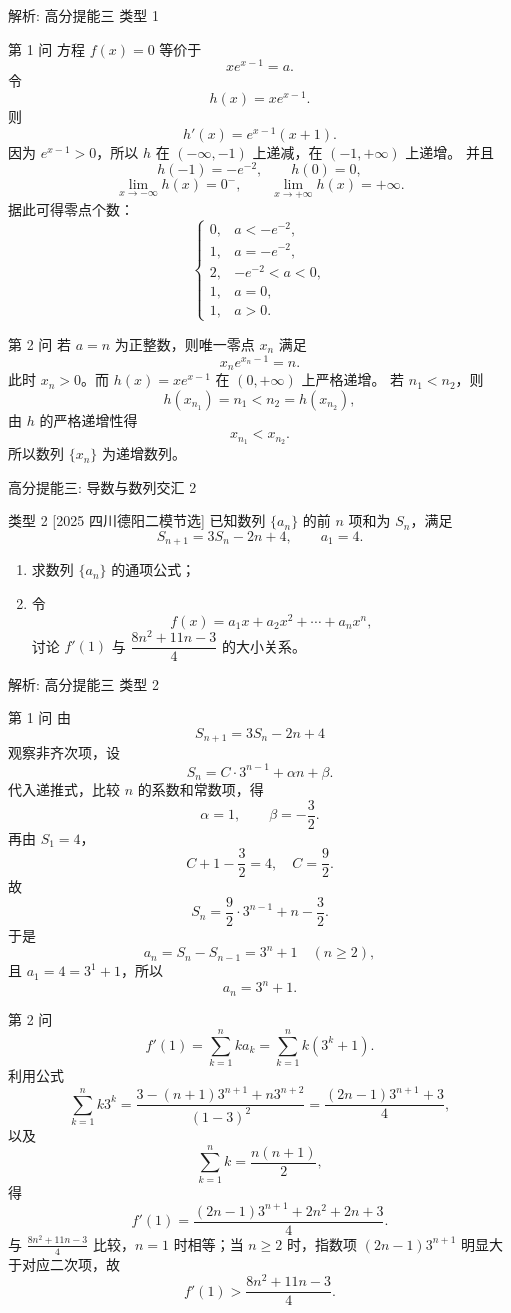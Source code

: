 ﻿\documentclass[aspectratio=169,10pt]{ctexbeamer}
\begin{document}
\begin{frame}[t,allowframebreaks]{解析: 高分提能三 类型 1}
\tiny
\begin{block}{第 1 问}
方程 $f(x)=0$ 等价于
\[
xe^{x-1}=a.
\]
令
\[
h(x)=xe^{x-1}.
\]
则
\[
h'(x)=e^{x-1}(x+1).
\]
因为 $e^{x-1}>0$，所以 $h$ 在 $(-\infty,-1)$ 上递减，在 $(-1,+\infty)$ 上递增。
并且
\[
h(-1)=-e^{-2},\qquad h(0)=0,
\]
\[
\lim_{x\to-\infty}h(x)=0^-,\qquad \lim_{x\to+\infty}h(x)=+\infty.
\]
据此可得零点个数：
\[
\begin{cases}
0,&a<-e^{-2},\\
1,&a=-e^{-2},\\
2,&-e^{-2}<a<0,\\
1,&a=0,\\
1,&a>0.
\end{cases}
\]
\end{block}
\begin{block}{第 2 问}
若 $a=n$ 为正整数，则唯一零点 $x_n$ 满足
\[
x_ne^{x_n-1}=n.
\]
此时 $x_n>0$。而 $h(x)=xe^{x-1}$ 在 $(0,+\infty)$ 上严格递增。
若 $n_1<n_2$，则
\[
h(x_{n_1})=n_1<n_2=h(x_{n_2}),
\]
由 $h$ 的严格递增性得
\[
x_{n_1}<x_{n_2}.
\]
所以数列 $\{x_n\}$ 为递增数列。
\end{block}
\end{frame}

\begin{frame}[t]{高分提能三: 导数与数列交汇 2}
\large
\begin{block}{类型 2}
[2025 四川德阳二模节选] 已知数列 $\{a_n\}$ 的前 $n$ 项和为 $S_n$，满足
\[
S_{n+1}=3S_n-2n+4,\qquad a_1=4.
\]
\begin{enumerate}
  \item 求数列 $\{a_n\}$ 的通项公式；
  \item 令
  \[
  f(x)=a_1x+a_2x^2+\cdots+a_nx^n,
  \]
  讨论 $f'(1)$ 与 $\dfrac{8n^2+11n-3}{4}$ 的大小关系。
\end{enumerate}
\end{block}
\end{frame}

\begin{frame}[t,allowframebreaks]{解析: 高分提能三 类型 2}
\tiny
\begin{block}{第 1 问}
由
\[
S_{n+1}=3S_n-2n+4
\]
观察非齐次项，设
\[
S_n=C\cdot3^{n-1}+\alpha n+\beta.
\]
代入递推式，比较 $n$ 的系数和常数项，得
\[
\alpha=1,\qquad \beta=-\frac32.
\]
再由 $S_1=4$，
\[
C+1-\frac32=4,\quad C=\frac92.
\]
故
\[
S_n=\frac92\cdot3^{n-1}+n-\frac32.
\]
于是
\[
a_n=S_n-S_{n-1}=3^n+1\quad (n\ge2),
\]
且 $a_1=4=3^1+1$，所以
\[
a_n=3^n+1.
\]
\end{block}
\begin{block}{第 2 问}
\[
f'(1)=\sum_{k=1}^n k a_k
=\sum_{k=1}^n k(3^k+1).
\]
利用公式
\[
\sum_{k=1}^n k3^k=\frac{3-(n+1)3^{n+1}+n3^{n+2}}{(1-3)^2}
=\frac{(2n-1)3^{n+1}+3}{4},
\]
以及
\[
\sum_{k=1}^n k=\frac{n(n+1)}2,
\]
得
\[
f'(1)=\frac{(2n-1)3^{n+1}+2n^2+2n+3}{4}.
\]
与 $\frac{8n^2+11n-3}{4}$ 比较，$n=1$ 时相等；当 $n\ge2$ 时，指数项 $(2n-1)3^{n+1}$ 明显大于对应二次项，故
\[
f'(1)>\frac{8n^2+11n-3}{4}.
\]
\end{block}
\end{frame}
\end{document}
